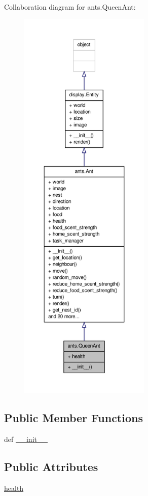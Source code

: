Collaboration diagram for ants.\+Queen\+Ant\+:
\nopagebreak
\begin{figure}[H]
\begin{center}
\leavevmode
\includegraphics[height=550pt]{classants_1_1QueenAnt__coll__graph}
\end{center}
\end{figure}
\subsection*{Public Member Functions}
\begin{DoxyCompactItemize}
\item 
def \hyperlink{classants_1_1QueenAnt_aea3ff8fa90122567905806f675eb9472}{\+\_\+\+\_\+init\+\_\+\+\_\+}
\end{DoxyCompactItemize}
\subsection*{Public Attributes}
\begin{DoxyCompactItemize}
\item 
\hyperlink{classants_1_1QueenAnt_adb02e07e568bf5cf90408cb641cb5b57}{health}
\end{DoxyCompactItemize}


